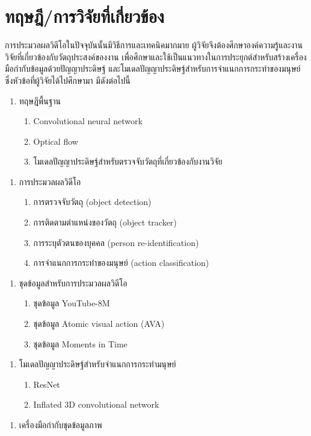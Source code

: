 \clearpage
\chapter{ทฤษฎี/การวิจัยที่เกี่ยวข้อง}
การประมวลผลวิดีโอในปัจจุบันนั้นมีวิธีการและเทคนิคมากมาย ผู้วิจัยจึงต้องศึกษาองค์ความรู้และงานวิจัยที่เกี่ยวข้องกับวัตถุประสงค์ของงาน 
เพื่อศึกษาและใช้เป็นแนวทางในการประยุกต์สำหรับสร้างเครื่องมือกำกับข้อมูลด้วยปัญญาประดิษฐ์ และโมเดลปัญญาประดิษฐ์สำหรับการจำแนกการกระทำของมนุษย์ 
ซึ่งหัวข้อที่ผู้วิจัยได้ไปศึกษามา มีดังต่อไปนี้
\begin{enumerate}[label*=2.1.]
	\setlength\itemsep{-0.25em}
	\item ทฤษฎีพื้นฐาน
	\begin{enumerate}[label*=\arabic*.]
		\item Convolutional neural network
		\item Optical flow
		\item โมเดลปัญญาประดิษฐ์สำหรับตรวจจับวัตถุที่เกี่ยวข้องกับงานวิจัย
	\end{enumerate}
\end{enumerate}
\begin{enumerate}[label*=2.2.]
	\item การประมวลผลวิดีโอ
	\begin{enumerate}[label*=\arabic*.]
		\item การตรวจจับวัตถุ (object detection)
		\item การติดตามตำแหน่งของวัตถุ (object tracker)
		\item การระบุตัวตนของบุคคล (person re-identification)
		\item การจำแนกการกระทำของมนุษย์ (action classification)
	\end{enumerate}
\end{enumerate}
\begin{enumerate}[label*=2.3.]
	\item ชุดข้อมูลสำหรับการประมวลผลวิดีโอ
	\begin{enumerate}[label*=\arabic*.]
		\item ชุดข้อมูล YouTube-8M
		\item ชุดข้อมูล Atomic visual action (AVA)
		\item ชุดข้อมูล Moments in Time
	\end{enumerate}
\end{enumerate}
\begin{enumerate}[label*=2.4.]
	\item โมเดลปัญญาประดิษฐ์สำหรับจำแนกการกระทำมนุษย์
	\begin{enumerate}[label*=\arabic*.]
		\item ResNet
		\item Inflated 3D convolutional network
	\end{enumerate}
\end{enumerate}
\begin{enumerate}[label*=2.5.]
	\item เครื่องมือกำกับชุดข้อมูลภาพ
\end{enumerate}
\clearpage

